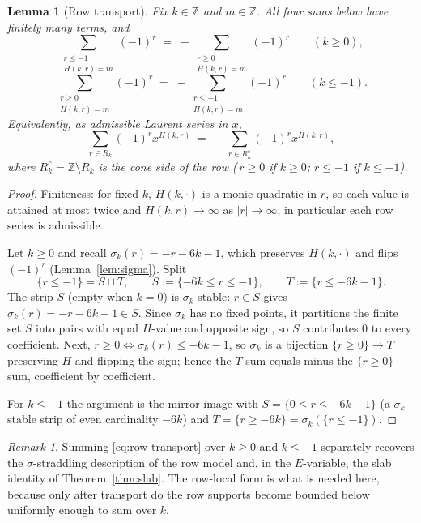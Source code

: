 \documentclass[12pt]{amsart}
\newtheorem{lemma}[theorem]{Lemma}
\theoremstyle{definition}
\theoremstyle{remark}
\newtheorem{remark}[theorem]{Remark}
\newcommand{\ZZ}{\mathbb{Z}}
\begin{document}
\begin{lemma}[Row transport]\label{lem:row-transport}
Fix $k\in\ZZ$ and $m\in\ZZ$.  All four sums below have finitely many
terms, and
\[
  \sum_{\substack{r\le-1\\ H(k,r)=m}}(-1)^r
  \;=\;-\!\!\sum_{\substack{r\ge0\\ H(k,r)=m}}(-1)^r
  \qquad(k\ge0),
\]
\[
  \sum_{\substack{r\ge0\\ H(k,r)=m}}(-1)^r
  \;=\;-\!\!\sum_{\substack{r\le-1\\ H(k,r)=m}}(-1)^r
  \qquad(k\le-1).
\]
Equivalently, as admissible Laurent series in $x$,
\begin{equation}\label{eq:row-transport}
  \sum_{r\in R_k}(-1)^r x^{H(k,r)}
  \;=\;
  -\sum_{r\in R_k^{c}}(-1)^r x^{H(k,r)},
\end{equation}
where $R_k^{c}=\ZZ\setminus R_k$ is the cone side of the row
($\,r\ge0$ if $k\ge0$; $r\le-1$ if $k\le-1$).
\end{lemma}

\begin{proof}
Finiteness: for fixed $k$, $H(k,\cdot)$ is a monic quadratic in $r$,
so each value is attained at most twice and $H(k,r)\to\infty$ as
$|r|\to\infty$; in particular each row series is admissible.

Let $k\ge0$ and recall $\sigma_k(r)=-r-6k-1$, which preserves
$H(k,\cdot)$ and flips $(-1)^r$ (Lemma~\ref{lem:sigma}).  Split
\[
  \{r\le-1\}=S\sqcup T,\qquad
  S:=\{-6k\le r\le-1\},\qquad
  T:=\{r\le-6k-1\}.
\]
The strip $S$ (empty when $k=0$) is $\sigma_k$-stable: $r\in S$ gives
$\sigma_k(r)=-r-6k-1\in S$.  Since $\sigma_k$ has no fixed points, it
partitions the finite set $S$ into pairs with equal $H$-value and
opposite sign, so $S$ contributes $0$ to every coefficient.  Next,
$r\ge0\iff\sigma_k(r)\le-6k-1$, so $\sigma_k$ is a bijection
$\{r\ge0\}\to T$ preserving $H$ and flipping the sign; hence the
$T$-sum equals minus the $\{r\ge0\}$-sum, coefficient by coefficient.

For $k\le-1$ the argument is the mirror image with
$S=\{0\le r\le-6k-1\}$ (a $\sigma_k$-stable strip of even cardinality
$-6k$) and $T=\{r\ge-6k\}=\sigma_k(\{r\le-1\})$.
\end{proof}

\begin{remark}
Summing \eqref{eq:row-transport} over $k\ge0$ and $k\le-1$ separately
recovers the $\sigma$-straddling description of the row model and,
in the $E$-variable, the slab identity of Theorem~\ref{thm:slab}.  The
row-local form is what is needed here, because only after transport do
the row supports become bounded below uniformly enough to sum over
$k$.
\end{remark}
\end{document}
